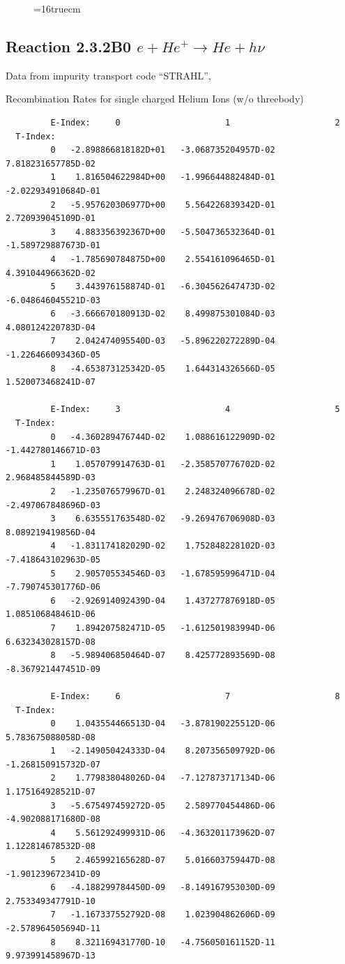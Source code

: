 \documentclass[12pt,dvips]{article}
\begin{document}
\begin{figure} \label{2.8A0}
\epsfxsize=16truecm 
\end{figure}
\newpage

\subsection{
Reaction 2.3.2B0  $e + He^+ \rightarrow He + h\nu$
}
Data from impurity transport code ``STRAHL'', \cite{kn:Behringer}

  Recombination Rates for single charged Helium Ions (w/o threebody)


\begin{small}\begin{verbatim}
         E-Index:     0                     1                     2
  T-Index:
         0   -2.898866818182D+01   -3.068735204957D-02    7.818231657785D-02
         1    1.816504622984D+00   -1.996644882484D-01   -2.022934910684D-01
         2   -5.957620306977D+00    5.564226839342D-01    2.720939045109D-01
         3    4.883356392367D+00   -5.504736532364D-01   -1.589729887673D-01
         4   -1.785690784875D+00    2.554161096465D-01    4.391044966362D-02
         5    3.443976158874D-01   -6.304562647473D-02   -6.048646045521D-03
         6   -3.666670180913D-02    8.499875301084D-03    4.080124220783D-04
         7    2.042474095540D-03   -5.896220272289D-04   -1.226466093436D-05
         8   -4.653873125342D-05    1.644314326566D-05    1.520073468241D-07

         E-Index:     3                     4                     5
  T-Index:
         0   -4.360289476744D-02    1.088616122909D-02   -1.442780146671D-03
         1    1.057079914763D-01   -2.358570776702D-02    2.968485844589D-03
         2   -1.235076579967D-01    2.248324096678D-02   -2.497067848696D-03
         3    6.635551763548D-02   -9.269476706908D-03    8.089219419856D-04
         4   -1.831174182029D-02    1.752848228102D-03   -7.418643102963D-05
         5    2.905705534546D-03   -1.678595996471D-04   -7.790745301776D-06
         6   -2.926914092439D-04    1.437277876918D-05    1.085106848461D-06
         7    1.894207582471D-05   -1.612501983994D-06    6.632343028157D-08
         8   -5.989406850464D-07    8.425772893569D-08   -8.367921447451D-09

         E-Index:     6                     7                     8
  T-Index:
         0    1.043554466513D-04   -3.878190225512D-06    5.783675088058D-08
         1   -2.149050424333D-04    8.207356509792D-06   -1.268150915732D-07
         2    1.779838048026D-04   -7.127873717134D-06    1.175164928521D-07
         3   -5.675497459272D-05    2.589770454486D-06   -4.902088171680D-08
         4    5.561292499931D-06   -4.363201173962D-07    1.122814678532D-08
         5    2.465992165628D-07    5.016603759447D-08   -1.901239672341D-09
         6   -4.188299784450D-09   -8.149167953030D-09    2.753349347791D-10
         7   -1.167337552792D-08    1.023904862606D-09   -2.578964505694D-11
         8    8.321169431770D-10   -4.756050161152D-11    9.973991458967D-13


\end{verbatim}
\end{small}
\end{document}
